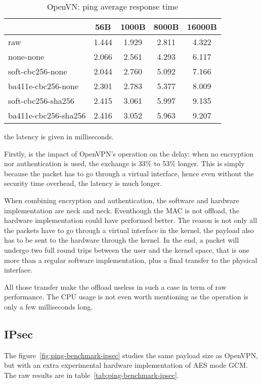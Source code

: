 \begin{table}[ht]
\center
\small
\begin{tabular}{l|c|c|c|c|} \cline{2-5}
 & 56B & 1000B & 8000B & 16000B \\ \hline
\multicolumn{1}{|l|}{raw} & 1.444 & 1.929 & 2.811 & 4.322 \\ \hline
\multicolumn{1}{|l|}{none-none} & 2.066 & 2.561 & 4.293 & 6.117 \\ \hline
\multicolumn{1}{|l|}{soft-cbc256-none} & 2.044 & 2.760 & 5.092 & 7.166\\ \hline
\multicolumn{1}{|l|}{ba411e-cbc256-none} & 2.301 & 2.783 & 5.377 & 8.009\\ \hline
\multicolumn{1}{|l|}{soft-cbc256-sha256} & 2.415 & 3.061 & 5.997 & 9.135 \\ \hline
\multicolumn{1}{|l|}{ba411e-cbc256-sha256} & 2.416 & 3.052 & 5.963 & 9.207 \\ \hline
\end{tabular}
\caption{OpenVN: ping average response time}{the latency is given in milliseconds.}
\label{tab:ping-benchmark-openvpn}
\end{table}

Firstly, is the impact of OpenVPN's operation on the delay: when no encryption nor authentication is used, the exchange is 33\% to 53\% longer. This is simply because the packet has to go through a virtual interface, hence even without the security time overhead, the latency is much longer.

When combining encryption and authentication, the software and hardware implementation are neck and neck.
Eventhough the MAC is not offload, the hardware implementation could have performed better.
The reason is not only all the packets have to go through a virtual interface in the kernel, the payload also has to be sent to the hardware through the kernel.
In the end, a packet will undergo two full round trips between the user and the kernel space, that is one more than a regular software implementation, plus a final transfer to the physical interface.

\noindent All those transfer make the offload useless in such a case in term of raw performance.
The CPU usage is not even worth mentioning as the operation is only a few milliseconds long.



\subsection{IPsec}
The figure~\ref{fig:ping-benchmark-ipsec} studies the same payload size as OpenVPN, but with an extra experimental hardware implementation of AES mode GCM. The raw results are in table~\ref{tab:ping-benchmark-ipsec}.


